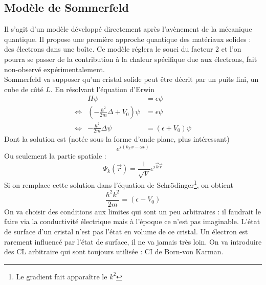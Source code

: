 \subsection{Modèle de Sommerfeld}
Il s'agit d'un modèle développé directement après l'avènement de la 
mécanique quantique. Il propose une première approche quantique des 
matériaux solides : des électrons dans une boîte. Ce modèle réglera 
le souci du facteur 2 et l'on pourra se passer de la contribution à 
la chaleur spécifique due aux électrons, fait non-observé 
expérimentalement.\\


Sommerfeld va supposer qu'un cristal solide peut être décrit par un 
puits fini, un cube de côté $L$.  En résolvant l'équation d'Erwin  
\begin{equation}
\begin{array}{lll}
&H\psi &=  \epsilon\psi\\
\Leftrightarrow&\left(-\frac{\hbar^2}{2m}\Delta + V_0\right)\psi &= \epsilon\psi\\
\Leftrightarrow&-\frac{\hbar^2}{2m}\Delta \psi &= (\epsilon+V_0)\psi
\end{array}
\end{equation}
Dont la solution est (notée sous la forme d'onde plane, plus 
intéressant)
\begin{equation}
e^{i(k_xx-\omega t)}
\end{equation}
Ou seulement la partie spatiale :
\begin{equation}
\Psi_k(\vec r) = \frac{1}{\sqrt{V}} e^{i\vec k \vec{r}}
\end{equation}
Si on remplace cette solution dans l'équation de Schrödinger\footnote{
Le gradient fait apparaître le $k^2$}, on obtient
\begin{equation}
\frac{\hbar^2k^2}{2m} = (\epsilon-V_0)
\end{equation}
On va choisir des conditions aux limites qui sont un peu arbitraires :
il faudrait le faire via la conductivité électrique mais à l'époque ce 
n'est pas imaginable. L'état de surface d'un cristal n'est pas 
l'état en volume de ce cristal. Un électron est rarement influencé 
par l'état de surface, il ne va jamais très loin. On va introduire 
des CL arbitraire qui sont toujours utilisée : CI de Born-von Karman.\\

